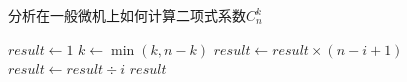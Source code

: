 \begin{questions}
\begin{parts}
\begin{solution}
        \end{solution}
    \end{parts}

    \question 分析在一般微机上如何计算二项式系数$C_n^k$
    \begin{solution}
        \begin{algorithmic}[1]
            \State $result \gets 1$
            \State $k \gets \min(k, n-k)$
            \State $result \gets result \times (n-i+1)$
            \State $result \gets result \div i$
            \EndFor
            \State \Return $result$
        \end{algorithmic}
    \end{solution}


\end{questions}

